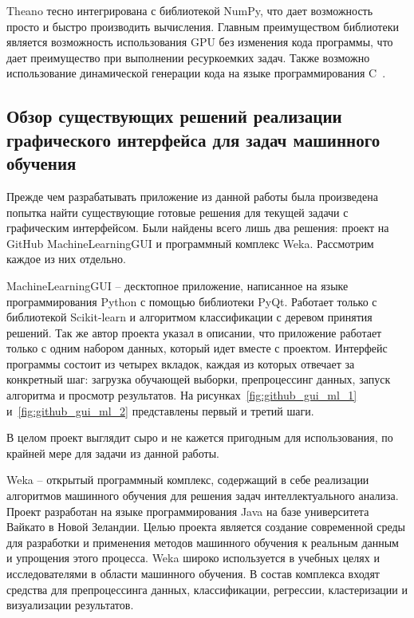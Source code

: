 Theano тесно интегрирована с библиотекой NumPy, что дает возможность просто и быстро производить вычисления. Главным преимуществом библиотеки является возможность использования GPU без изменения кода программы, что дает преимущество при выполнении ресуркоемких задач. Также возможно использование динамической генерации кода на языке программирования C~\cite{douson}.


\subsection{Обзор существующих решений реализации графического интерфейса для задач машинного обучения}

Прежде чем разрабатывать приложение из данной работы была произведена попытка найти существующие готовые решения для текущей задачи с графическим интерфейсом. Были найдены всего лишь два решения: проект на GitHub MachineLearningGUI и программный комплекс Weka. Рассмотрим каждое из них отдельно.


MachineLearningGUI -- десктопное приложение, написанное на языке программирования Python с помощью библиотеки PyQt. Работает только с библиотекой Scikit-learn и алгоритмом классификации с деревом принятия решений. Так же автор проекта указал в описании, что приложение работает только с одним набором данных, который идет вместе с проектом. Интерфейс программы состоит из четырех вкладок, каждая из которых отвечает за конкретный шаг: загрузка обучающей выборки, препроцессинг данных, запуск алгоритма и просмотр результатов. На рисунках~\ref{fig:github_gui_ml_1} и~\ref{fig:github_gui_ml_2} представлены первый и третий шаги.





В целом проект выглядит сыро и не кажется пригодным для использования, по крайней мере для задачи из данной работы.


Weka -- открытый программный комплекс, содержащий в себе реализации алгоритмов машинного обучения для решения задач интеллектуального анализа. Проект разработан на языке программирования Java на базе университета Вайкато в Новой Зеландии. Целью проекта является создание современной среды для разработки и применения методов машинного обучения к реальным данным и упрощения этого процесса. Weka широко используется в учебных целях и исследователями в области машинного обучения. В состав комплекса входят средства для препроцессинга данных, классификации, регрессии, кластеризации и визуализации результатов\cite{weka1}.



